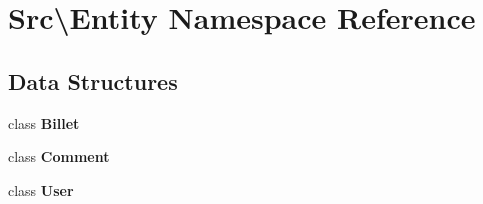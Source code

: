 \section{Src\textbackslash{}Entity Namespace Reference}
\label{namespace_src_1_1_entity}
\subsection*{Data Structures}
\begin{DoxyCompactItemize}
\item 
class \textbf{ Billet}
\item 
class \textbf{ Comment}
\item 
class \textbf{ User}
\end{DoxyCompactItemize}
